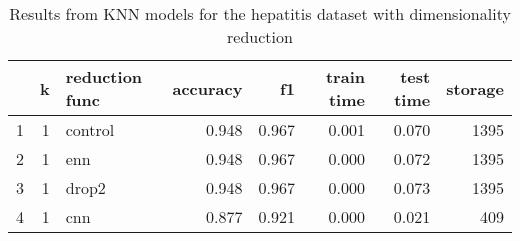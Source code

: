 \begin{table}
\centering
\caption{Results from KNN models for the hepatitis dataset with dimensionality reduction}
\begin{tabular}{rrlrrrrr}
\toprule
 & k & reduction func & accuracy & f1 & train time & test time & storage \\
\midrule
1 & 1 & control & 0.948 & 0.967 & 0.001 & 0.070 & 1395 \\
2 & 1 & enn & 0.948 & 0.967 & 0.000 & 0.072 & 1395 \\
3 & 1 & drop2 & 0.948 & 0.967 & 0.000 & 0.073 & 1395 \\
4 & 1 & cnn & 0.877 & 0.921 & 0.000 & 0.021 & 409 \\
\bottomrule
\end{tabular}
\end{table}
